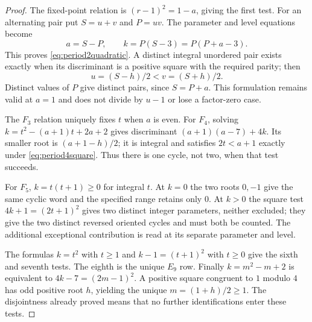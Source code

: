 \begin{proof}
The fixed-point relation is $(r-1)^2=1-a$, giving the
first test. For an alternating pair put $S=u+v$ and
$P=uv$. The parameter and level equations become
\[
 a=S-P,\qquad k=P(S-3)=P(P+a-3).
\]
This proves \eqref{eq:period2quadratic}. A distinct integral
unordered pair exists exactly when its discriminant is a
positive square with the required parity; then
\[
 u=(S-h)/2<v=(S+h)/2.
\]
Distinct values of $P$ give distinct pairs, since $S=P+a$.
This formulation remains valid at $a=1$ and does not divide
by $u-1$ or lose a factor-zero case.

The $F_3$ relation uniquely fixes $t$ when $a$ is even.
For $F_4$, solving
$k=t^2-(a+1)t+2a+2$ gives discriminant
$(a+1)(a-7)+4k$. Its smaller root is
$(a+1-h)/2$; it is integral and satisfies $2t<a+1$
exactly under \eqref{eq:period4square}. Thus there is
one cycle, not two, when that test succeeds.

For $F_5$, $k=t(t+1)\ge0$ for integral $t$.
At $k=0$ the two roots $0,-1$ give the same cyclic
word and the specified range retains only $0$. At $k>0$
the square test $4k+1=(2t+1)^2$ gives two distinct
integer parameters, neither excluded; they give the two
distinct reversed oriented cycles and must both be counted.
The additional exceptional contribution is read at its
separate parameter and level.

The formulas $k=t^2$ with $t\ge1$ and
$k-1=(t+1)^2$ with $t\ge0$ give the sixth and
seventh tests. The eighth is the unique $E_9$ row.
Finally $k=m^2-m+2$ is equivalent to
$4k-7=(2m-1)^2$. A positive square congruent to $1$
modulo $4$ has odd positive root $h$, yielding the unique
$m=(1+h)/2\ge1$. The disjointness already proved means
that no further identifications enter these tests.
\end{proof}


